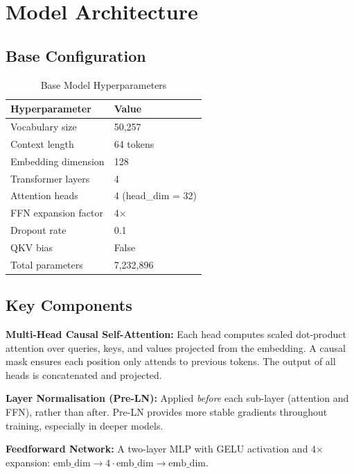 \documentclass[12pt,a4paper]{article}
\begin{document}
\section{Model Architecture}

\subsection{Base Configuration}

\begin{table}[H]
\centering
\caption{Base Model Hyperparameters}
\begin{tabular}{ll}
  \toprule
  \textbf{Hyperparameter} & \textbf{Value} \\
  \midrule
  Vocabulary size         & 50,257 \\
  Context length          & 64 tokens \\
  Embedding dimension     & 128 \\
  Transformer layers      & 4 \\
  Attention heads         & 4 (head\_dim = 32) \\
  FFN expansion factor    & 4$\times$ \\
  Dropout rate            & 0.1 \\
  QKV bias                & False \\
  Total parameters        & 7,232,896 \\
  \bottomrule
\end{tabular}
\end{table}

\subsection{Key Components}

\textbf{Multi-Head Causal Self-Attention:} Each head computes scaled dot-product attention over queries, keys, and values projected from the embedding. A causal mask ensures each position only attends to previous tokens. The output of all heads is concatenated and projected.

\textbf{Layer Normalisation (Pre-LN):} Applied \textit{before} each sub-layer (attention and FFN), rather than after. Pre-LN provides more stable gradients throughout training, especially in deeper models.

\textbf{Feedforward Network:} A two-layer MLP with GELU activation and 4$\times$ expansion: $\text{emb\_dim} \rightarrow 4 \cdot \text{emb\_dim} \rightarrow \text{emb\_dim}$.
\end{document}
